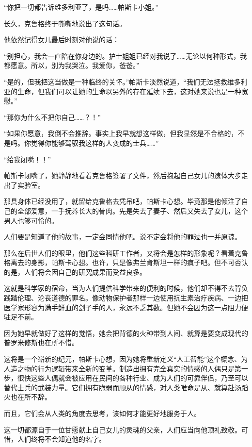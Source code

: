 “你把一切都告诉维多利亚了，是吗……帕斯卡小姐。”

长久，克鲁格终于嘶嘶地说出了这句话。

他依然记得女儿最后时刻对他说的话：

“别担心，我会一直陪在你身边的。护士姐姐已经对我说了……无论以何种形式，我都愿意。所以，别为我哭泣。我爱你，爸爸。”

“是的，但我把这当做是一种临终的关怀。”帕斯卡淡然说道，“我们无法拯救维多利亚的生命，但我们可以让她的生命以另外的存在延续下去，这对她来说也是一种宽慰。”

“那你为什么不把你自己……？！”

“如果你愿意，我倒不会推辞。事实上我早就想这样做，但我显然是不合格的，不是吗。你觉得你能够驾驭我这样的人变成的士兵……”

“给我闭嘴！！”

帕斯卡闭嘴了，她静静地看着克鲁格签署了文件，然后抱起自己女儿的遗体大步走出了实验室。

那具身体已经没用了，就留给克鲁格去凭吊吧，帕斯卡心想。毕竟那是他倾注了自己的全部爱意，一手抚养长大的骨肉。先是失去了妻子、然后又失去了女儿，这个男人也够可怜的。

人们要是知道了他的故事，一定会同情他吧。说不定会将他的罪过也一并原谅。

那么在后世人们的眼里，他们这些科研工作者，又将会是怎样的形象呢？看着克鲁格离去的身影，帕斯卡心想。也许，只是像弗兰肯斯坦一样的疯子吧。但不可否认的是，人们将会因自己的研究成果而受益良多。

这就是科学家的宿命，当为人们提供科学带来的便利的时候，他们却不得不去背负践踏伦理、沦丧道德的罪名。像动物保护者那样一边使用抗生素治疗疾病、一边把医学家形容为满手鲜血的刽子手的人，永远不乏其数。但她不会因为这一点阻力便驻足不前。

因为她早就做好了这样的觉悟，她会把背德的火种带到人间、就算是要变成现代的普罗米修斯也在所不惜。

这将是一个崭新的纪元，帕斯卡心想，因为她将重新定义“人工智能”这个概念、为人造之物的行为逻辑带来全新的变革。制造出拥有完全真实的情感的人偶只是第一步，很快这些人偶就会被应用在民间的各种行业、成为人们的可靠伴侣，乃至可以替代士兵的武装力量。它们拥有脆弱而顺从的情感，对人类唯命是从、就算赴汤蹈火也在所不辞。

而且，它们会从人类的角度去思考，该如何才能更好地服务于人。

这一切都源自于一位甘愿献上自己女儿的灵魂的父亲，人们应当向他顶礼致敬。可惜，人们终将不会知道他的名字。

 \section*{}


